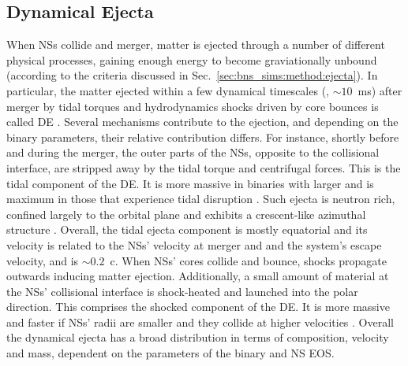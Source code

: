 \subsection{Dynamical Ejecta} \label{sec:bns_sims:dyn}



%
%



When \acp{NS} collide and merger, matter is ejected through a number of 
different physical processes, gaining enough energy to become graviationally 
unbound (according to the criteria discussed in Sec.~\ref{sec:bns_sims:method:ejecta}). 
In particular, the matter ejected within a few dynamical timescales (\ie, ${\sim}10$~ms) 
after merger by tidal torques and hydrodynamics shocks driven by core bounces 
is called \ac{DE} \citep[\eg][]{Hotokezaka:2013b,Bauswein:2013yna,Radice:2016dwd,Radice:2018pdn}. 
%
%
Several mechanisms contribute to the ejection, and depending on the 
binary parameters, their relative contribution differs.
%
For instance, shortly before and during the merger, the outer parts 
of the \acp{NS}, opposite to the collisional interface, are stripped 
away by the tidal torque and centrifugal forces. This is the tidal 
component of the \ac{DE}. It is more massive in binaries with 
larger \mr{} and is maximum in those that experience tidal disruption 
\citep[\eg][]{Radice:2018pdn,Bernuzzi:2020txg}.
%
Such ejecta is neutron rich, confined largely to the orbital plane and exhibits 
a crescent-like azimuthal structure \citep{Bernuzzi:2020txg}.
%
Overall, the tidal ejecta component is mostly equatorial and its 
velocity is related to the \acp{NS}' velocity at merger and 
and the system's escape velocity, and is $\sim0.2$~c.
%
When \acp{NS}' cores collide and bounce, shocks propagate outwards inducing 
matter ejection. Additionally, a small amount of material at the 
\acp{NS}' collisional interface is shock-heated and launched into the polar 
direction. This comprises the shocked component of the \ac{DE}.
%
It is more massive and faster if \acp{NS}' radii are smaller and they collide 
at higher velocities \citep[\eg][]{Radice:2018pdn}. 
%
Overall the dynamical ejecta has a broad distribution in terms of composition, 
velocity and mass, dependent on the parameters of the binary and \ac{NS} \ac{EOS}.


